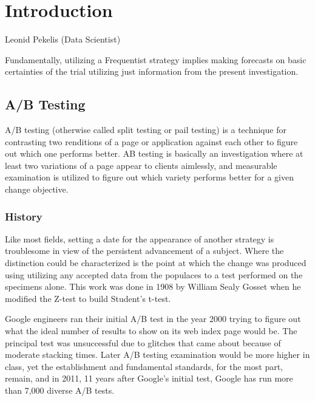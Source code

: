 \chapter{Introduction}
\begin{epigraphs}
%
      {Leonid Pekelis (Data Scientist)}
\end{epigraphs}      

Fundamentally, utilizing a Frequentist strategy implies making forecasts on basic certainties of the trial utilizing just information from the present investigation. \par

\section{A/B Testing}
A/B testing (otherwise called split testing or pail testing) is a technique for contrasting two renditions of a page or application against each other to figure out which one performs better. AB testing is basically an investigation where at least two variations of a page appear to clients aimlessly, and measurable examination is utilized to figure out which variety performs better for a given change objective.\par

\subsection{History}
Like most fields, setting a date for the appearance of another strategy is troublesome in view of the persistent advancement of a subject. Where the distinction could be characterized is the point at which the change was produced using utilizing any accepted data from the populaces to a test performed on the specimens alone. This work was done in 1908 by William Sealy Gosset when he modified the Z-test to build Student's t-test.\par

Google engineers ran their initial A/B test in the year 2000 trying to figure out what the ideal number of results to show on its web index page would be. The principal test was unsuccessful due to glitches that came about because of moderate stacking times. Later A/B testing examination would be more higher in class, yet the establishment and fundamental standards, for the most part, remain, and in 2011, 11 years after Google's initial test, Google has run more than 7,000 diverse A/B tests.\par

